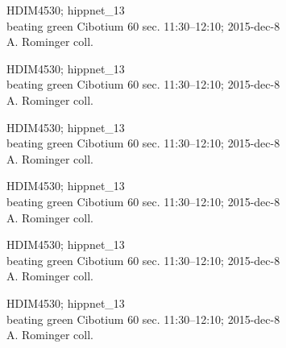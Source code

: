 \documentclass[2pt]{extarticle}
\begin{document}
\noindent
\parbox{0.16\textwidth}{\tiny \raggedright \rule[-0.3\baselineskip]{0pt}{10pt}HDIM4530; hippnet\_13\\ beating green Cibotium 60 sec. 11:30--12:10; 2015-dec-8\\ A. Rominger coll.}
\parbox{0.16\textwidth}{\tiny \raggedright \rule[-0.3\baselineskip]{0pt}{10pt}HDIM4530; hippnet\_13\\ beating green Cibotium 60 sec. 11:30--12:10; 2015-dec-8\\ A. Rominger coll.}
\parbox{0.16\textwidth}{\tiny \raggedright \rule[-0.3\baselineskip]{0pt}{10pt}HDIM4530; hippnet\_13\\ beating green Cibotium 60 sec. 11:30--12:10; 2015-dec-8\\ A. Rominger coll.}
\parbox{0.16\textwidth}{\tiny \raggedright \rule[-0.3\baselineskip]{0pt}{10pt}HDIM4530; hippnet\_13\\ beating green Cibotium 60 sec. 11:30--12:10; 2015-dec-8\\ A. Rominger coll.}
\parbox{0.16\textwidth}{\tiny \raggedright \rule[-0.3\baselineskip]{0pt}{10pt}HDIM4530; hippnet\_13\\ beating green Cibotium 60 sec. 11:30--12:10; 2015-dec-8\\ A. Rominger coll.}
\parbox{0.16\textwidth}{\tiny \raggedright \rule[-0.3\baselineskip]{0pt}{10pt}HDIM4530; hippnet\_13\\ beating green Cibotium 60 sec. 11:30--12:10; 2015-dec-8\\ A. Rominger coll.} \\ 
\vspace{0.001in} 
\end{document}
